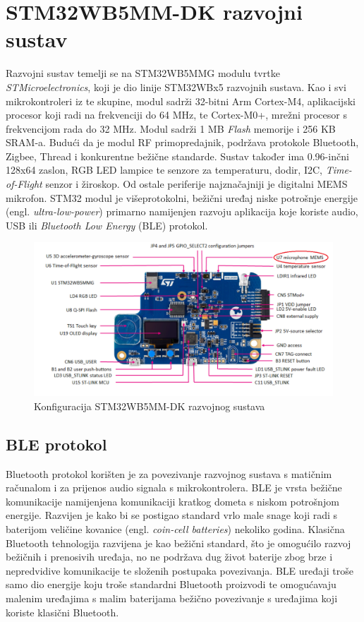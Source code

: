 \chapter{STM32WB5MM-DK razvojni sustav}

Razvojni sustav temelji se na STM32WB5MMG modulu tvrtke \textit{STMicroelectronics}, koji je dio linije STM32WBx5 razvojnih sustava. Kao i svi mikrokontroleri iz te skupine, modul sadrži 32-bitni Arm Cortex-M4, aplikacijski procesor koji radi na frekvenciji do 64 MHz, te Cortex-M0+, mrežni procesor s frekvencijom rada do 32 MHz. Modul sadrži 1 MB \textit{Flash} memorije i 256 KB SRAM-a. Budući da je modul RF primopredajnik, podržava protokole Bluetooth, Zigbee, Thread i konkurentne bežične standarde. Sustav također ima 0.96-inčni 128x64 zaslon, RGB LED lampice te senzore za temperaturu, dodir, I2C, \textit{Time-of-Flight} senzor i žiroskop. Od ostale periferije najznačajniji je digitalni MEMS mikrofon. STM32 modul je višeprotokolni, bežični uređaj niske potrošnje energije (engl. \textit{ultra-low-power}) primarno namijenjen razvoju aplikacija koje koriste audio, USB ili \textit{Bluetooth Low Energy} (BLE) protokol. 

\begin{figure}[ht]
	\includegraphics[width=\linewidth]{imgs/discovery_kit}
	\caption{Konfiguracija STM32WB5MM-DK razvojnog sustava}
	\label{fig:discovery-kit}
\end{figure}

\section{BLE protokol}

Bluetooth protokol korišten je za povezivanje razvojnog sustava s matičnim računalom i za prijenos audio signala s mikrokontrolera. BLE je vrsta bežične komunikacije namijenjena komunikaciji kratkog dometa s niskom potrošnjom energije. Razvijen je kako bi se postigao standard vrlo male snage koji radi s baterijom veličine kovanice (engl. \textit{coin-cell batteries}) nekoliko godina.
Klasična Bluetooth tehnologija razvijena je kao bežični standard, što je omogućilo razvoj bežičnih i prenosivih uređaja, no ne podržava dug život baterije zbog brze i nepredvidive komunikacije te složenih postupaka povezivanja. BLE uređaji troše samo dio energije koju troše standardni Bluetooth proizvodi te omogućavaju malenim uređajima s malim baterijama bežično povezivanje s uređajima koji koriste klasični Bluetooth.

